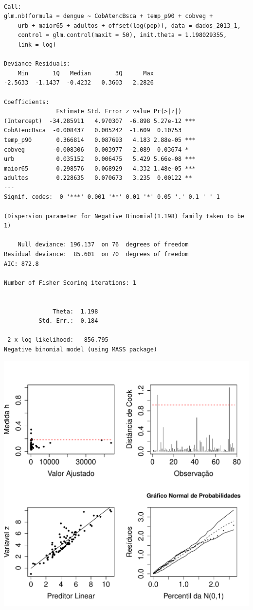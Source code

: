 \documentclass[12pt,a4paper]{article}\usepackage[]{graphicx}\usepackage[]{color}
\makeatletter
\def\maxwidth{ %
  \ifdim\Gin@nat@width>\linewidth
    \linewidth
  \else
    \Gin@nat@width
  \fi
}
\newenvironment{kframe}{%
 \def\at@end@of@kframe{}%
 \ifinner\ifhmode%
  \def\at@end@of@kframe{\end{minipage}}%
  \begin{minipage}{\columnwidth}%
 \fi\fi%
 \def\FrameCommand##1{\hskip\@totalleftmargin \hskip-\fboxsep
 \colorbox{shadecolor}{##1}\hskip-\fboxsep
     \hskip-\linewidth \hskip-\@totalleftmargin \hskip\columnwidth}%
 \MakeFramed {\advance\hsize-\width
   \@totalleftmargin\z@ \linewidth\hsize
   \@setminipage}}%
 {\par\unskip\endMakeFramed%
 \at@end@of@kframe}
\newenvironment{knitrout}{}{} %
\makeatother
\begin{document}
\begin{knitrout}
\color{fgcolor}\begin{kframe}
\begin{verbatim}

Call:
glm.nb(formula = dengue ~ CobAtencBsca + temp_p90 + cobveg + 
    urb + maior65 + adultos + offset(log(pop)), data = dados_2013_1, 
    control = glm.control(maxit = 50), init.theta = 1.198029355, 
    link = log)

Deviance Residuals: 
    Min       1Q   Median       3Q      Max  
-2.5633  -1.1437  -0.4232   0.3603   2.2826  

Coefficients:
               Estimate Std. Error z value Pr(>|z|)    
(Intercept)  -34.285911   4.970307  -6.898 5.27e-12 ***
CobAtencBsca  -0.008437   0.005242  -1.609  0.10753    
temp_p90       0.366814   0.087693   4.183 2.88e-05 ***
cobveg        -0.008306   0.003977  -2.089  0.03674 *  
urb            0.035152   0.006475   5.429 5.66e-08 ***
maior65        0.298576   0.068929   4.332 1.48e-05 ***
adultos        0.228635   0.070673   3.235  0.00122 ** 
---
Signif. codes:  0 '***' 0.001 '**' 0.01 '*' 0.05 '.' 0.1 ' ' 1

(Dispersion parameter for Negative Binomial(1.198) family taken to be 1)

    Null deviance: 196.137  on 76  degrees of freedom
Residual deviance:  85.601  on 70  degrees of freedom
AIC: 872.8

Number of Fisher Scoring iterations: 1


              Theta:  1.198 
          Std. Err.:  0.184 

 2 x log-likelihood:  -856.795 
Negative binomial model (using MASS package) 
\end{verbatim}
\end{kframe}
\includegraphics[width=\maxwidth]{figure/unnamed-chunk-19-1} 

\end{knitrout}
\end{document}
